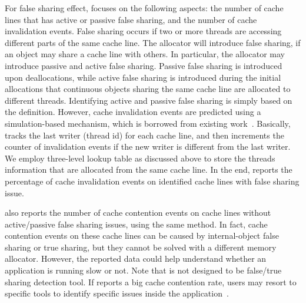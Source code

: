 For false sharing effect, \MP{} focuses on the following aspects: the number of cache lines that has active or passive false sharing, and the number of cache invalidation events. False sharing occurs if two or more threads are accessing different parts of the same cache line. The allocator will introduce false sharing, if an object may share a cache line with others. In particular, the allocator may introduce passive and active false sharing. Passive false sharing is introduced upon deallocations, while active false sharing is introduced during the initial allocations that continuous objects sharing the same cache line are allocated to different threads. Identifying active and passive false sharing is simply based on the definition. However, cache invalidation events are predicted using a simulation-based mechanism, which is borrowed from existing work~\cite{Cheetah}. Basically, \MP{} tracks the last writer (thread id) for each cache line, and then increments the counter of invalidation events if the new writer is different from the last writer. 
 We employ three-level lookup table as discussed above to store the threads information that are allocated from the same cache line. 
In the end, \MP{} reports the percentage of cache invalidation events on identified cache lines with false sharing issue. 

\MP{} also reports the number of cache contention events on cache lines without active/passive false sharing issues, using the same method. In fact, cache contention events on these cache lines can be caused by internal-object false sharing or true sharing, but they cannot be solved with a different memory allocator. However, the reported data could help understand whether an application is running slow or not. Note that \MP{} is not designed to be false/true sharing detection tool. If \MP{} reports a big cache contention rate, users may resort to specific tools to identify specific issues inside the application~\cite{Sheriff, Predator, DBLP:conf/ppopp/ChabbiWL18}. 
   

